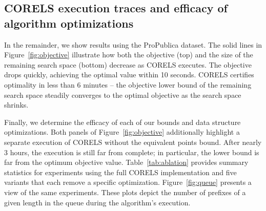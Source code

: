 \subsection{CORELS execution traces and efficacy of algorithm optimizations}
\label{sec:traces}

In the remainder, we show results using the ProPublica dataset.
%
The solid lines in Figure~\ref{fig:objective} illustrate how both the objective (top)
and the size of the remaining search space (bottom) decrease as CORELS executes.
%
The objective drops quickly, achieving the optimal value within 10 seconds.
CORELS certifies optimality in less than 6 minutes --
the objective lower bound of the remaining search space
steadily converges to the optimal objective as the search space shrinks.

Finally, we determine the efficacy of each of our bounds and data structure optimizations.
%
Both panels of Figure~\ref{fig:objective} additionally highlight a separate
execution of CORELS without the equivalent points bound.
%
After nearly 3 hours, the execution is still far from complete;
in particular, the lower bound is far from the optimum objective value.
%
Table~\ref{tab:ablation} provides summary statistics for experiments using the full
CORELS implementation and five variants that each remove a specific optimization.
%
Figure~\ref{fig:queue} presents a view of the same experiments.
%
These plots depict the number of prefixes of a given length in the queue
during the algorithm's execution.

